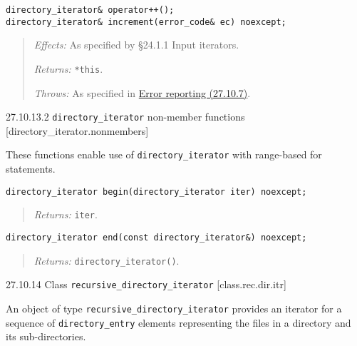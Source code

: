 \begin{verbatim}
directory_iterator& operator++();
directory_iterator& increment(error_code& ec) noexcept;
\end{verbatim}

\begin{quote}
\emph{Effects:} As specified by §24.1.1 Input iterators.

\emph{Returns:} \texttt{*this}.

\emph{Throws:} As specified in \hyperref[Error-reporting]{Error
reporting (27.10.7)}.
\end{quote}

27.10.13.2 \texttt{directory\_iterator} non-member functions
{[}directory\_iterator.nonmembers{]}

These functions enable use of \texttt{directory\_iterator} with
range-based for statements.

\begin{verbatim}
directory_iterator begin(directory_iterator iter) noexcept;
\end{verbatim}

\begin{quote}
\emph{Returns:} \texttt{iter}.
\end{quote}

\begin{verbatim}
directory_iterator end(const directory_iterator&) noexcept;
\end{verbatim}

\begin{quote}
\emph{Returns:} \texttt{directory\_iterator()}.
\end{quote}

27.10.14 Class \texttt{recursive\_directory\_iterator}
{[}class.rec.dir.itr{]}

An object of type \texttt{recursive\_directory\_iterator} provides an
iterator for a sequence of \texttt{directory\_entry} elements
representing the files in a directory and its sub-directories.

